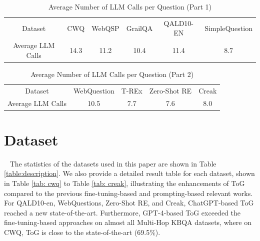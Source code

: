 \documentclass{article} %
\begin{document}
\begin{table}
\centering
\begin{tabular}{c|c|c|c|c|c}
\hline
Dataset & CWQ & WebQSP & GrailQA & QALD10-EN & SimpleQuestion \\

Average LLM Calls & 14.3 & 11.2 & 10.4 & 11.4 & 8.7 \\
\hline
\end{tabular}
\caption{Average Number of LLM Calls per Question (Part 1)}
\label{tab:llm-calls-part1}
\end{table}

\begin{table}
\centering
\begin{tabular}{c|c|c|c|c}
\hline
Dataset & WebQuestion & T-REx & Zero-Shot RE & Creak \\
Average LLM Calls & 10.5 & 7.7 & 7.6 & 8.0 \\
\hline
\end{tabular}
\caption{Average Number of LLM Calls per Question (Part 2)}
\label{tab:llm-calls-part2}
\end{table}



\section{Dataset}~\label{sec: datasets}
The statistics of the datasets used in this paper are shown in Table \ref{table:description}.
We also provide a detailed result table for each dataset, shown in Table \ref{tab: cwq} to Table \ref{tab: creak}, illustrating the enhancements of ToG compared to the previous fine-tuning-based and prompting-based relevant works.
For QALD10-en, WebQuestions, Zero-Shot RE, and Creak, ChatGPT-based ToG reached a new state-of-the-art. Furthermore, GPT-4-based ToG exceeded the fine-tuning-based approaches on almost all Multi-Hop KBQA datasets, where on CWQ, ToG is close to the state-of-the-art (69.5\%).
\end{document}
